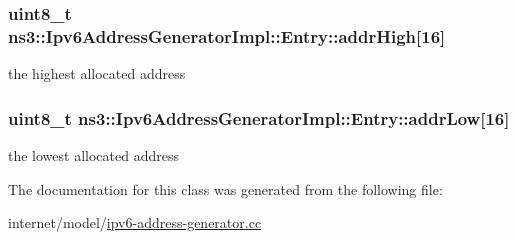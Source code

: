 \subsubsection[{\texorpdfstring{addr\+High}{addrHigh}}]{\setlength{\rightskip}{0pt plus 5cm}uint8\+\_\+t ns3\+::\+Ipv6\+Address\+Generator\+Impl\+::\+Entry\+::addr\+High\mbox{[}16\mbox{]}}\hypertarget{classns3_1_1Ipv6AddressGeneratorImpl_1_1Entry_abad0befbd49c75dd39533427921b71bc}{}\label{classns3_1_1Ipv6AddressGeneratorImpl_1_1Entry_abad0befbd49c75dd39533427921b71bc}


the highest allocated address 

\subsubsection[{\texorpdfstring{addr\+Low}{addrLow}}]{\setlength{\rightskip}{0pt plus 5cm}uint8\+\_\+t ns3\+::\+Ipv6\+Address\+Generator\+Impl\+::\+Entry\+::addr\+Low\mbox{[}16\mbox{]}}\hypertarget{classns3_1_1Ipv6AddressGeneratorImpl_1_1Entry_a4863bb362745edd0ba5f1f09313fad46}{}\label{classns3_1_1Ipv6AddressGeneratorImpl_1_1Entry_a4863bb362745edd0ba5f1f09313fad46}


the lowest allocated address 



The documentation for this class was generated from the following file\+:\begin{DoxyCompactItemize}
\item 
internet/model/\hyperlink{ipv6-address-generator_8cc}{ipv6-\/address-\/generator.\+cc}\end{DoxyCompactItemize}
